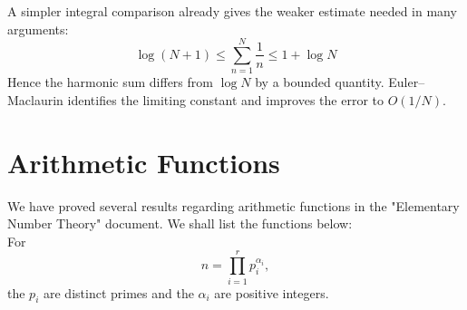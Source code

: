 \documentclass[a4paper,11pt,abstracton]{scrartcl}
\theoremstyle{dotlessP}
\theoremstyle{dotlessS}
\theoremstyle{remark}
\theoremstyle{definition}
\begin{document}
\begin{remark_box}
A simpler integral comparison already gives the weaker estimate needed
in many arguments:
\[
    \log(N+1)
      \leq\sum_{n=1}^{N}\frac1n
      \leq1+\log N
\]
Hence the harmonic sum differs from $\log N$ by a bounded quantity.
Euler--Maclaurin identifies the limiting constant and improves the
error to $O(1/N)$.
\end{remark_box}

\section{Arithmetic Functions}
\label{sec:arithmetic-functions}
We have proved several results regarding arithmetic functions in the "Elementary Number Theory" document. We shall list the functions below:
\\For
\[
    n=\prod_{i=1}^{r}p_i^{\alpha_i},
\]
the $p_i$ are distinct primes and the $\alpha_i$ are positive integers.
\end{document}
